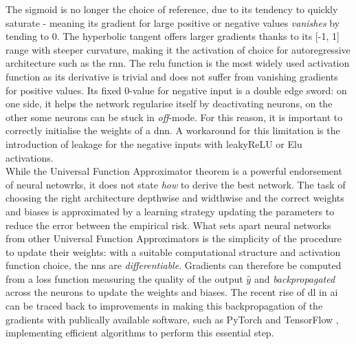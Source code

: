 The sigmoid is no longer the choice of reference, due to its tendency to quickly saturate - meaning its gradient for large positive or negative values \textit{vanishes} by tending to 0. The hyperbolic tangent offers larger gradients thanks to its [-1, 1] range with steeper curvature, making it the activation of choice for autoregressive architecture such as the \gls{rnn}. The \gls{relu} function is the most widely used activation function as its derivative is trivial and does not suffer from vanishing gradients for positive values. Its fixed 0-value for negative input is a double edge sword: on one side, it helps the network regularise itself by deactivating neurons, on the other some neurons can be stuck in \textit{off}-mode. For this reason, it is important to correctly initialise the weights of a \gls{dnn}. A workaround for this limitation is the introduction of leakage for the negative inputs with leakyReLU or Elu activations.\\

While the Universal Function Approximator theorem is a powerful endorsement of neural netowrks, it does not state \textit{how} to derive the best network. The task of choosing the right architecture depthwise and widthwise and the correct weights and biases is approximated by a learning strategy updating the parameters to reduce the error between the empirical risk. What sets apart neural networks from other Universal Function Approximators is the simplicity of the procedure to update their weights: with a suitable computational structure and activation function choice, the \glspl{nn} are \textit{differentiable}. Gradients can therefore be computed from a loss function measuring the quality of the output $\hat{y}$ and \textit{backpropagated} across the neurons to update the weights and biases. The recent rise of \gls{dl} in \gls{ai} can be traced back to improvements in making this backpropagation of the gradients with publically available software, such as PyTorch \cite{pytorch} and TensorFlow \cite{tensorflow2015-whitepaper}, implementing efficient algorithms to perform this essential step. \\

